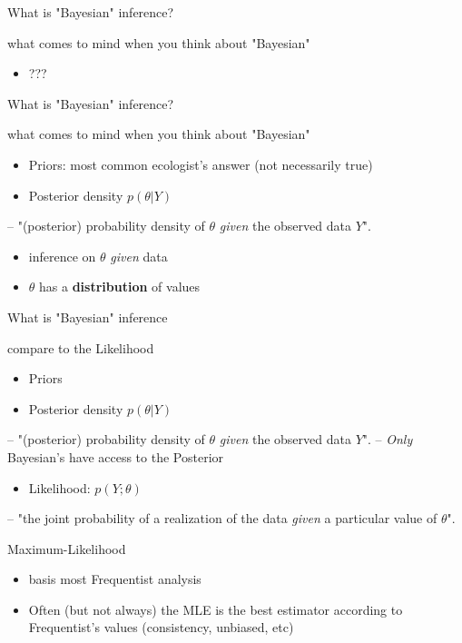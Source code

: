 \documentclass[presentation]{beamer}
\begin{document}
\begin{frame}[label=sec-3]{What is "Bayesian" inference?}
\begin{block}{what comes to mind when you think about "Bayesian"}
\begin{itemize}
\item ???
\end{itemize}
\end{block}
\end{frame}

\begin{frame}[label=sec-4]{What is "Bayesian" inference?}
\begin{block}{what comes to mind when you think about "Bayesian"}
\begin{itemize}
\item Priors: most common ecologist's answer (not necessarily true)
\item Posterior density
 $p(\theta\vert Y)$
\end{itemize}
-- "(posterior) probability density of $\theta$ \emph{given} the observed data $Y$".
\begin{itemize}
\item inference on $\theta$ \emph{given} data
\item $\theta$ has a \textbf{distribution} of values
\end{itemize}
\end{block}
\end{frame}
\begin{frame}[label=sec-5]{What is "Bayesian" inference}
\begin{block}{compare to the Likelihood}
\begin{itemize}
\item Priors
\item Posterior density
 $p(\theta\vert Y)$
\end{itemize}
-- "(posterior) probability density of $\theta$ \emph{given} the observed data $Y$".
-- \emph{Only} Bayesian's have access to the Posterior
\begin{itemize}
\item Likelihood: $p(Y;\theta)$
\end{itemize}
-- "the joint probability of a realization of the data \emph{given} a particular value of $\theta$".
\end{block}

\begin{block}{Maximum-Likelihood}
\begin{itemize}
\item basis most Frequentist analysis
\item Often (but not always) the MLE is the best estimator according to Frequentist's values (consistency, unbiased, etc)
\end{itemize}
\end{block}
\end{frame}
\end{document}
